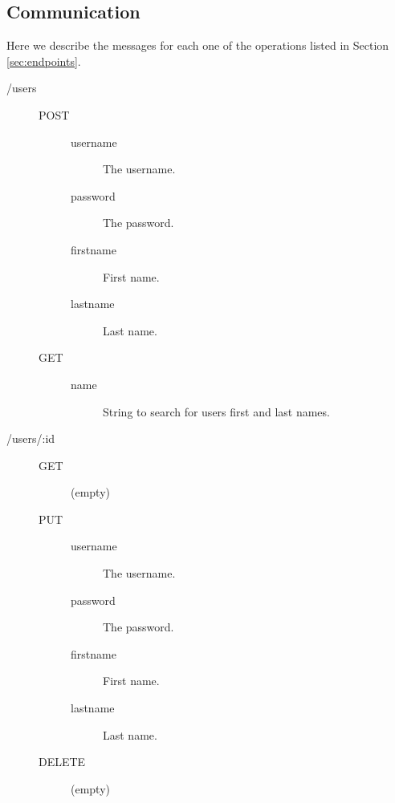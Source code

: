 \subsection{Communication} \label{sec:communication}

Here we describe the messages for each one of the operations listed in Section
\ref{sec:endpoints}.

\begin{description}
  \item [/users] \hfill
    \begin{description}
      \item [POST] \hfill
        \begin{description}
          \item [username] The username.
          \item [password] The password.
          \item [firstname] First name.
          \item [lastname] Last name.
        \end{description}
      \item [GET] \hfill
        \begin{description}
          \item [name] String to search for users first and last names.
        \end{description}
    \end{description}
  \item [/users/:id] \hfill
    \begin{description}
      \item [GET] \hfill
        \begin{description}
          \item [(empty)]
        \end{description}
      \item [PUT] \hfill
        \begin{description}
          \item [username] The username.
          \item [password] The password.
          \item [firstname] First name.
          \item [lastname] Last name.
        \end{description}
      \item [DELETE] \hfill
        \begin{description}
          \item [(empty)]
        \end{description}

\end{description}
\end{description}
